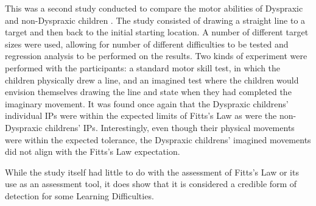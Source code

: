 		This was a second study conducted to compare the motor abilities of Dyspraxic and non-Dyspraxic children \cite{Wilson2001}. The study consisted of drawing a straight line to a target and then back to the initial starting location. A number of different target sizes were used, allowing for number of different difficulties to be tested and regression analysis to be performed on the results. Two kinds of experiment were performed with the participants: a standard motor skill test, in which the children physically drew a line, and an imagined test where the children would envision themselves drawing the line and state when they had completed the imaginary movement. It was found once again that the Dyspraxic childrens’ individual IPs were within the expected limits of Fitts’s Law as were the non-Dyspraxic childrens’ IPs. Interestingly, even though their physical movements were within the expected tolerance, the Dyspraxic childrens’ imagined movements did not align with the Fitts’s Law expectation.
		
		While the study itself had little to do with the assessment of Fitts’s Law or its use as an assessment tool, it does show that it is considered a credible form of detection for some Learning Difficulties.
		
\newpage